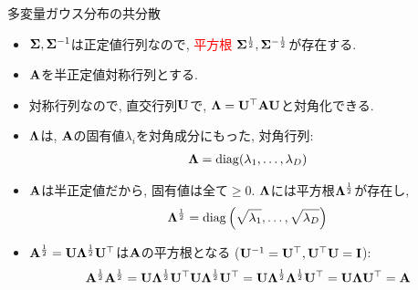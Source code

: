 \documentclass[dvipdfmx,notheorems,t]{beamer}
\begin{document}
\begin{frame}{多変量ガウス分布の共分散}
\begin{itemize}
  \item $\vb{\Sigma}, \vb{\Sigma}^{-1}$は正定値行列なので,
  \textcolor{red}{平方根} $\vb{\Sigma}^\frac{1}{2}, \vb{\Sigma}^{-\frac{1}{2}}$が存在する.
  \item $\vb{A}$を半正定値対称行列とする.
  \item 対称行列なので, 直交行列$\vb{U}$で, $\vb{\Lambda} = \vb{U}^\top \vb{A} \vb{U}$と対角化できる.
  \item $\vb{\Lambda}$は, $\vb{A}$の固有値$\lambda_i$を対角成分にもった, 対角行列:
  \begin{align*}
    \vb{\Lambda} = \operatorname{diag}(\lambda_1, \ldots, \lambda_D)
  \end{align*}
  \item $\vb{A}$は半正定値だから, 固有値は全て$\ge 0$.
  $\vb{\Lambda}$には平方根$\vb{\Lambda}^\frac{1}{2}$が存在し,
  \begin{align*}
    \vb{\Lambda}^\frac{1}{2} = \operatorname{diag} \left( \sqrt{\lambda_1}, \ldots, \sqrt{\lambda_D} \right)
  \end{align*}
  \item $\vb{A}^\frac{1}{2} = \vb{U} \vb{\Lambda}^\frac{1}{2} \vb{U}^\top$は$\vb{A}$の平方根となる
  ($\vb{U}^{-1} = \vb{U}^\top, \vb{U}^\top \vb{U} = \vb{I}$):
  \begin{align*}
    \vb{A}^\frac{1}{2} \vb{A}^\frac{1}{2}
    = \vb{U} \vb{\Lambda}^\frac{1}{2} \vb{U}^\top \vb{U} \vb{\Lambda}^\frac{1}{2} \vb{U}^\top
    = \vb{U} \vb{\Lambda}^\frac{1}{2} \vb{\Lambda}^\frac{1}{2} \vb{U}^\top
    = \vb{U} \vb{\Lambda} \vb{U}^\top
    = \vb{A}
  \end{align*}
\end{itemize}
\end{frame}
\end{document}
